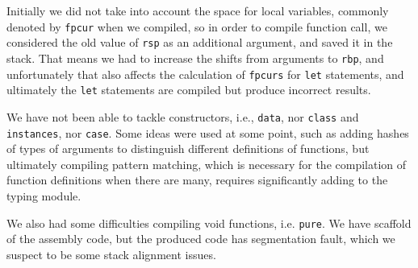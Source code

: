 \documentclass{amsart}
\begin{document}
	Initially we did not take into account the space for local variables, commonly denoted by \texttt{fpcur} when we compiled, so in order to compile function call, we considered the old value of \texttt{rsp} as an additional argument, and saved it in the stack. That means we had to increase the shifts from arguments to \texttt{rbp}, and unfortunately that also affects the calculation of \texttt{fpcurs} for \texttt{let} statements, and ultimately the \texttt{let} statements are compiled but produce incorrect results.
	
	We have not been able to tackle constructors, i.e., \texttt{data}, nor \texttt{class} and \texttt{instances}, nor \texttt{case}. Some ideas were used at some point, such as adding hashes of types of arguments to distinguish different definitions of functions, but ultimately compiling pattern matching, which is necessary for the compilation of function definitions when there are many, requires significantly adding to the typing module.
	
	We also had some difficulties compiling void functions, i.e. \texttt{pure}. We have scaffold of the assembly code, but the produced code has segmentation fault, which we suspect to be some stack alignment issues.
\end{document}
